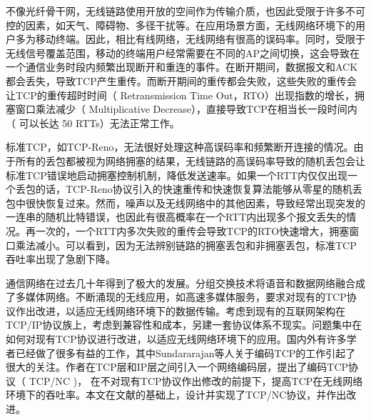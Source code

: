 \par
不像光纤骨干网，无线链路使用开放的空间作为传输介质，也因此受限于许多不可控的因素，如天气、障碍物、多径干扰等。在应用场景方面，无线网络环境下的用户多为移动终端。因此，相比有线网络，无线网络有很高的误码率。同时，受限于无线信号覆盖范围，移动的终端用户经常需要在不同的AP之间切换，这会导致在一个通信业务时段内频繁出现断开和重连的事件。在断开期间，数据报文和ACK都会丢失，导致TCP产生重传。而断开期间的重传都会失败，这些失败的重传会让TCP的重传超时时间（ Retransmission Time Out，RTO）出现指数的增长，拥塞窗口乘法减少（ Multiplicative Decrease），直接导致TCP在相当长一段时间内（  可以长达 50 RTTs）无法正常工作\textsuperscript{\cite{YE2005}}。
\par
标准TCP，如TCP-Reno，无法很好处理这种高误码率和频繁断开连接的情况。由于所有的丢包都被视为网络拥塞的结果，无线链路的高误码率导致的随机丢包会让标准TCP错误地启动拥塞控制机制，降低发送速率。如果一个RTT内仅仅出现一个丢包的话，TCP-Reno协议引入的快速重传和快速恢复算法能够从零星的随机丢包中很快恢复过来。然而，噪声以及无线网络中的其他因素，导致经常出现突发的一连串的随机比特错误，也因此有很高概率在一个RTT内出现多个报文丢失的情况。再一次的，一个RTT内多次失败的重传会导致TCP的RTO快速增大，拥塞窗口乘法减小。可以看到，因为无法辨别链路的拥塞丢包和非拥塞丢包，标准TCP吞吐率出现了急剧下降。

\par
通信网络在过去几十年得到了极大的发展。分组交换技术将语音和数据网络融合成了多媒体网络。不断涌现的无线应用，如高速多媒体服务，要求对现有的TCP协议作出改进，以适应无线网络环境下的数据传输。考虑到现有的互联网架构在TCP/IP协议族上，考虑到兼容性和成本，另建一套协议体系不现实。问题集中在如何对现有TCP协议进行改进，以适应无线网络环境下的应用。国内外有许多学者已经做了很多有益的工作，其中Sundararajan等人关于编码TCP\textsuperscript{\cite{Sundararajan2009}}的工作引起了很大的关注。作者在TCP层和IP层之间引入一个网络编码层，提出了编码TCP协议（ TCP/NC )， 在不对现有TCP协议作出修改的前提下，提高TCP在无线网络环境下的吞吐率。本文在文献\cite{Sundararajan2009}的基础上，设计并实现了TCP/NC协议，并作出改进。


